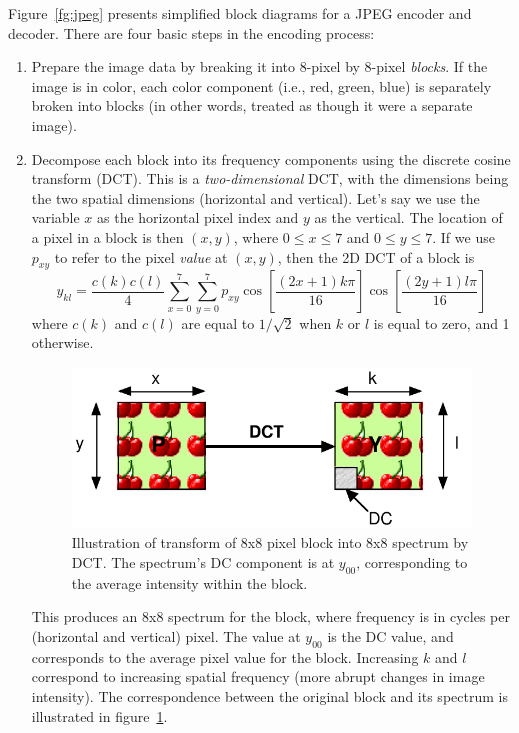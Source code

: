 Figure~\ref{fg:jpeg} presents simplified block diagrams for a JPEG
encoder and decoder.  There are four basic steps in the encoding
process:
\begin{enumerate}
\item Prepare the image data by breaking it into 8-pixel by 8-pixel
\emph{blocks}. If the image is in color, each color component (i.e.,
red, green, blue) is separately broken into blocks (in other words,
treated as though it were a separate image).

\item Decompose each block into its frequency components using the
discrete cosine transform (DCT). This is a \emph{two-dimensional} DCT, 
with the dimensions being the two spatial dimensions (horizontal and
vertical). Let's say we use the variable $x$ as the horizontal pixel
index and $y$ as the vertical. The location of a pixel in a block is
then $(x,y)$, where $0 \leq x \leq 7$ and $0 \leq y \leq 7$. If we use 
$p_{xy}$ to refer to the pixel \emph{value} at $(x,y)$, then the 2D
DCT of a block is
\begin{equation}
y_{kl} = \frac{c(k)c(l)}{4} \sum_{x=0}^7 \sum_{y=0}^7
           p_{xy} \cos\left[\frac{(2x+1)k\pi}{16}\right]
                  \cos\left[\frac{(2y+1)l\pi}{16}\right]
\end{equation}
where $c(k)$ and $c(l)$ are equal to $1/\sqrt{2}$ when $k$ or $l$ is
equal to zero, and 1 otherwise.

\begin{figure}
\centerline{\includegraphics[width=\textwidth]{ch-av/fig9-2}}
\caption[Illustration of transform of 8x8 pixel block into 8x8 
spectrum by DCT]{Illustration of transform of 8x8 pixel block into 8x8
spectrum by DCT.  The spectrum's DC component is at $y_{00}$,
corresponding to the average intensity within the
block.\label{fg:dct}}
\end{figure}

This produces an 8x8 spectrum for the block, where frequency is in
cycles per (horizontal and vertical) pixel. The value at $y_{00}$ is
the DC value, and corresponds to the average pixel value for the
block.  Increasing $k$ and $l$ correspond to increasing spatial
frequency (more abrupt changes in image intensity). The correspondence 
between the original block and its spectrum is illustrated in
figure~\ref{fg:dct}.


\end{enumerate}
